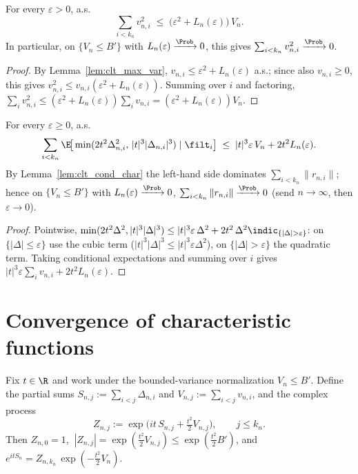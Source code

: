 \begin{lemma}\label{lem:clt_sum_var_sq}
\leanok
{}
For every $\varepsilon>0$, a.s.
\[
  \sum_{i<k_n} v_{n,i}^2 \;\le\; \big(\varepsilon^2 + L_n(\varepsilon)\big)\,V_n .
\]
In particular, on $\{V_n\le B'\}$ with $L_n(\varepsilon)\xrightarrow{\Prob}0$, this
gives $\sum_{i<k_n}v_{n,i}^2\xrightarrow{\Prob}0$.
\end{lemma}

\begin{proof}\leanok
{}
By Lemma~\ref{lem:clt_max_var}, $v_{n,i}\le\varepsilon^2+L_n(\varepsilon)$ a.s.;
since also $v_{n,i}\ge0$, this gives $v_{n,i}^2\le v_{n,i}(\varepsilon^2+L_n(\varepsilon))$.
Summing over $i$ and factoring, $\sum_i v_{n,i}^2\le(\varepsilon^2+L_n(\varepsilon))\sum_i v_{n,i}
=(\varepsilon^2+L_n(\varepsilon))V_n$.
\end{proof}

\begin{lemma}\label{lem:clt_sum_rem}
\leanok
{}
For every $\varepsilon\ge0$, a.s.
\[
  \sum_{i<k_n}\E\!\big[\min(2t^2\Delta_{n,i}^2,\,|t|^3|\Delta_{n,i}|^3)\mid\filt_i\big]
  \;\le\; |t|^3\varepsilon\,V_n + 2t^2 L_n(\varepsilon).
\]
By Lemma~\ref{lem:clt_cond_char} the left-hand side dominates $\sum_{i<k_n}\|r_{n,i}\|$;
hence on $\{V_n\le B'\}$ with $L_n(\varepsilon)\xrightarrow{\Prob}0$,
$\sum_{i<k_n}\|r_{n,i}\|\xrightarrow{\Prob}0$ (send $n\to\infty$, then $\varepsilon\to0$).
\end{lemma}

\begin{proof}\leanok
{}
Pointwise, $\min(2t^2\Delta^2,|t|^3|\Delta|^3)\le
|t|^3\varepsilon\,\Delta^2 + 2t^2\,\Delta^2\indic_{\{|\Delta|>\varepsilon\}}$: on
$\{|\Delta|\le\varepsilon\}$ use the cubic term ($|t|^3|\Delta|^3\le|t|^3\varepsilon\Delta^2$),
on $\{|\Delta|>\varepsilon\}$ the quadratic term. Taking conditional expectations
and summing over $i$ gives $|t|^3\varepsilon\sum_i v_{n,i}+2t^2 L_n(\varepsilon)$.
\end{proof}

\section{Convergence of characteristic functions}
\label{sec:pre_clt_char}

Fix $t\in\R$ and work under the bounded-variance normalization $V_n\le B'$.
Define the partial sums $S_{n,j}:=\sum_{i<j}\Delta_{n,i}$ and
$V_{n,j}:=\sum_{i<j}v_{n,i}$, and the complex process
\[
  Z_{n,j} := \exp\!\Big(i t\,S_{n,j} + \tfrac{t^2}{2}V_{n,j}\Big),
  \qquad j\le k_n .
\]
Then $Z_{n,0}=1$, $\ |Z_{n,j}|=\exp(\tfrac{t^2}{2}V_{n,j})\le\exp(\tfrac{t^2}{2}B')$,
and $e^{itS_n}=Z_{n,k_n}\,\exp(-\tfrac{t^2}{2}V_n)$.

